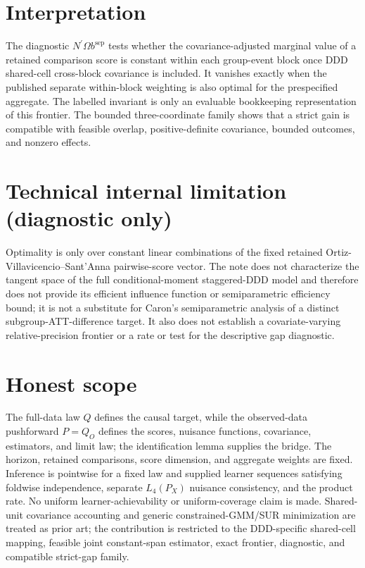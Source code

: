 \documentclass{article}
\begin{document}
\section{Interpretation}

The diagnostic \(N^{\prime}\Omega b^{\mathrm{sep}}\) tests whether the covariance-adjusted marginal value of a retained comparison score is constant within each group-event block once DDD shared-cell cross-block covariance is included. It vanishes exactly when the published separate within-block weighting is also optimal for the prespecified aggregate. The labelled invariant is only an evaluable bookkeeping representation of this frontier. The bounded three-coordinate family shows that a strict gain is compatible with feasible overlap, positive-definite covariance, bounded outcomes, and nonzero effects.

\section*{Technical internal limitation (diagnostic only)}

Optimality is only over constant linear combinations of the fixed retained Ortiz-Villavicencio--Sant'Anna pairwise-score vector. The note does not characterize the tangent space of the full conditional-moment staggered-DDD model and therefore does not provide its efficient influence function or semiparametric efficiency bound; it is not a substitute for Caron's semiparametric analysis of a distinct subgroup-ATT-difference target. It also does not establish a covariate-varying relative-precision frontier or a rate or test for the descriptive gap diagnostic.

\section{Honest scope}

The full-data law \(Q\) defines the causal target, while the observed-data pushforward \(P=Q_O\) defines the scores, nuisance functions, covariance, estimators, and limit law; the identification lemma supplies the bridge. The horizon, retained comparisons, score dimension, and aggregate weights are fixed. Inference is pointwise for a fixed law and supplied learner sequences satisfying foldwise independence, separate \(L_4(P_X)\) nuisance consistency, and the product rate. No uniform learner-achievability or uniform-coverage claim is made. Shared-unit covariance accounting and generic constrained-GMM/SUR minimization are treated as prior art; the contribution is restricted to the DDD-specific shared-cell mapping, feasible joint constant-span estimator, exact frontier, diagnostic, and compatible strict-gap family.
\end{document}
